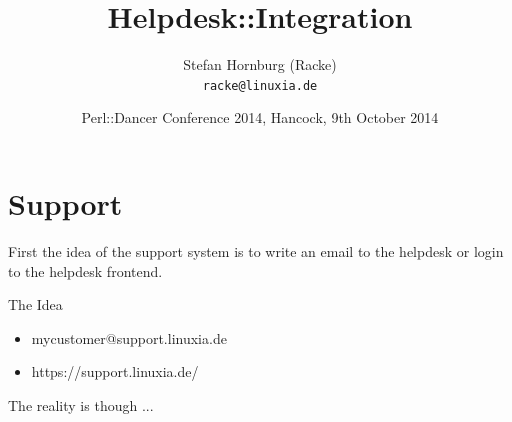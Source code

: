 \usepackage[utf8]{inputenc}
\usepackage[T1]{fontenc}
\usepackage{mathptmx}
\usepackage[scaled=.90]{helvet}
\usepackage{courier}
\usepackage{caption}
\captionsetup{labelformat=empty,labelsep=none}
\usepackage{verbatim}
\usepackage{hyperref}
\usepackage{listings}
\usepackage{ulem}
\lstset{language=Perl,basicstyle=\normalsize,tabsize=3,showstringspaces=false}

\title{Helpdesk::Integration}
\author[racke]{Stefan Hornburg (Racke)\\ \texttt{racke@linuxia.de}}
\date{Perl::Dancer Conference 2014, Hancock, 9th October 2014}


\maketitle{}

\begin{frame}
  \titlepage
\end{frame}

\tableofcontents

\section{Support}

First the idea of the support system is to write an email to the helpdesk
or login to the helpdesk frontend.

\begin{frame}[fragile]{The Idea}
\begin{itemize}
\item mycustomer@support.linuxia.de
\item https://support.linuxia.de/
\end{itemize}
\end{frame}

The reality is though ...


